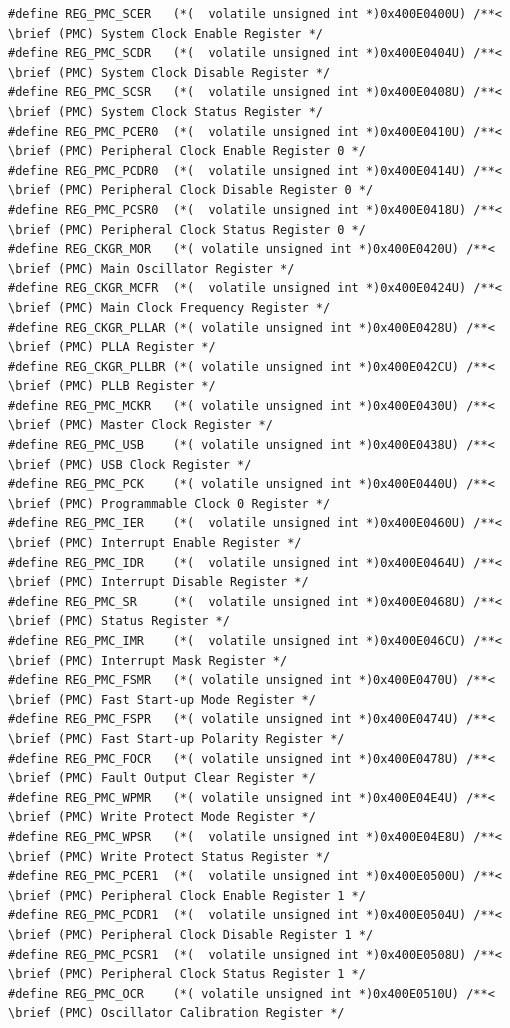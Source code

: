 \documentclass[12pt]{article}
\begin{document}
\begin{tiny}
\begin{verbatim}
#define REG_PMC_SCER   (*(  volatile unsigned int *)0x400E0400U) /**< \brief (PMC) System Clock Enable Register */
#define REG_PMC_SCDR   (*(  volatile unsigned int *)0x400E0404U) /**< \brief (PMC) System Clock Disable Register */
#define REG_PMC_SCSR   (*(  volatile unsigned int *)0x400E0408U) /**< \brief (PMC) System Clock Status Register */
#define REG_PMC_PCER0  (*(  volatile unsigned int *)0x400E0410U) /**< \brief (PMC) Peripheral Clock Enable Register 0 */
#define REG_PMC_PCDR0  (*(  volatile unsigned int *)0x400E0414U) /**< \brief (PMC) Peripheral Clock Disable Register 0 */
#define REG_PMC_PCSR0  (*(  volatile unsigned int *)0x400E0418U) /**< \brief (PMC) Peripheral Clock Status Register 0 */
#define REG_CKGR_MOR   (*( volatile unsigned int *)0x400E0420U) /**< \brief (PMC) Main Oscillator Register */
#define REG_CKGR_MCFR  (*(  volatile unsigned int *)0x400E0424U) /**< \brief (PMC) Main Clock Frequency Register */
#define REG_CKGR_PLLAR (*( volatile unsigned int *)0x400E0428U) /**< \brief (PMC) PLLA Register */
#define REG_CKGR_PLLBR (*( volatile unsigned int *)0x400E042CU) /**< \brief (PMC) PLLB Register */
#define REG_PMC_MCKR   (*( volatile unsigned int *)0x400E0430U) /**< \brief (PMC) Master Clock Register */
#define REG_PMC_USB    (*( volatile unsigned int *)0x400E0438U) /**< \brief (PMC) USB Clock Register */
#define REG_PMC_PCK    (*( volatile unsigned int *)0x400E0440U) /**< \brief (PMC) Programmable Clock 0 Register */
#define REG_PMC_IER    (*(  volatile unsigned int *)0x400E0460U) /**< \brief (PMC) Interrupt Enable Register */
#define REG_PMC_IDR    (*(  volatile unsigned int *)0x400E0464U) /**< \brief (PMC) Interrupt Disable Register */
#define REG_PMC_SR     (*(  volatile unsigned int *)0x400E0468U) /**< \brief (PMC) Status Register */
#define REG_PMC_IMR    (*(  volatile unsigned int *)0x400E046CU) /**< \brief (PMC) Interrupt Mask Register */
#define REG_PMC_FSMR   (*( volatile unsigned int *)0x400E0470U) /**< \brief (PMC) Fast Start-up Mode Register */
#define REG_PMC_FSPR   (*( volatile unsigned int *)0x400E0474U) /**< \brief (PMC) Fast Start-up Polarity Register */
#define REG_PMC_FOCR   (*( volatile unsigned int *)0x400E0478U) /**< \brief (PMC) Fault Output Clear Register */
#define REG_PMC_WPMR   (*( volatile unsigned int *)0x400E04E4U) /**< \brief (PMC) Write Protect Mode Register */
#define REG_PMC_WPSR   (*(  volatile unsigned int *)0x400E04E8U) /**< \brief (PMC) Write Protect Status Register */
#define REG_PMC_PCER1  (*(  volatile unsigned int *)0x400E0500U) /**< \brief (PMC) Peripheral Clock Enable Register 1 */
#define REG_PMC_PCDR1  (*(  volatile unsigned int *)0x400E0504U) /**< \brief (PMC) Peripheral Clock Disable Register 1 */
#define REG_PMC_PCSR1  (*(  volatile unsigned int *)0x400E0508U) /**< \brief (PMC) Peripheral Clock Status Register 1 */
#define REG_PMC_OCR    (*( volatile unsigned int *)0x400E0510U) /**< \brief (PMC) Oscillator Calibration Register */


\end{verbatim}
\end{tiny}
\end{document}
